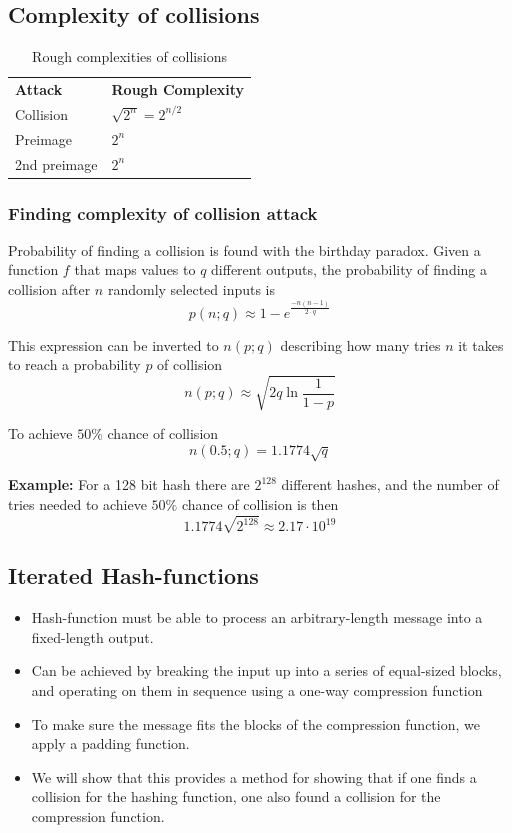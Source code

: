 \subsection{Complexity of collisions}
\begin{table}[H]
  \centering
  \begin{tabular}{ll}
    \textbf{Attack} & \textbf{Rough Complexity} \\
    Collision & $\sqrt{2^n}=2^{n/2}$ \\
    Preimage & $2^n$ \\
    2nd preimage & $2^n$ \\
  \end{tabular}
  \caption{Rough complexities of collisions}
\end{table}

\subsubsection*{Finding complexity of collision attack}
Probability of finding a collision is found with the birthday paradox. Given a function $f$ that maps
values to $q$ different outputs, the probability of finding a
collision after $n$ randomly selected inputs is
\[ p(n; q) \approx 1 - e^{\frac{-n(n-1)}{2\cdot q}}\]

This expression can be inverted to $n(p; q)$ describing how many tries
$n$ it takes to reach a probability $p$ of collision
\[ n(p; q) \approx \sqrt{2q \ln \frac{1}{1 - p}} \]

To achieve $50\%$ chance of collision
\[ n(0.5; q) = 1.1774 \sqrt{q} \]

\textbf{Example:} For a 128 bit hash there are $2^{128}$ different
hashes, and the number of tries needed to achieve $50\%$ chance of
collision is then
\[ 1.1774 \sqrt{2^{128}} \approx 2.17 \cdot 10^{19} \]

\subsection{Iterated Hash-functions}
\begin{itemize}
\item Hash-function must be able to process an arbitrary-length
  message into a fixed-length output.
\item Can be achieved by breaking the input up into a series of
  equal-sized blocks, and operating on them in sequence using a
  one-way compression function
\item To make sure the message fits the blocks of the compression
  function, we apply a padding function.
\item We will show that this provides a method for showing that if one
  finds a collision for the hashing function, one also found a
  collision for the compression function.
\end{itemize}

